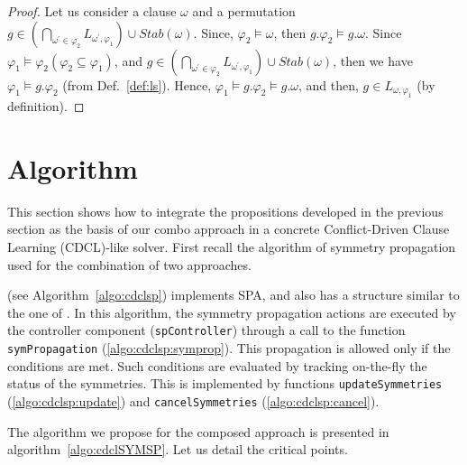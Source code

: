 \begin{proof}
 Let us consider a clause $\omega$ and a permutation $g \in 
 (\underset{\omega^\prime \in \varphi_2}{\bigcap}L_{\omega^\prime,\varphi_1})
 \cup Stab(\omega)$.
 Since, $\varphi_2 \models \omega$, then  $g.\varphi_2 \models g.\omega$. Since $\varphi_1 \models \varphi_2 (\varphi_2 \subseteq \varphi_1)$, and 
 $g \in 
 (\underset{\omega^\prime \in \varphi_2}{\bigcap}L_{\omega^\prime,\varphi_1})
 \cup Stab(\omega)$, then we have $\varphi_1 \models g.\varphi_2$ (from Def.~\ref{def:ls}). Hence, $\varphi_1 \models g.\varphi_2 \models g.\omega$, and then, $g \in L_{\omega,\varphi_1}$ (by definition). 
\end{proof}

\section{Algorithm}
This section shows how to integrate the propositions developed in the previous
section as the basis of our combo approach in a concrete
Conflict-Driven Clause Learning (CDCL)-like solver.
First recall the algorithm of symmetry propagation used for the combination of two approaches.

{\cdclsp} (see Algorithm~\ref{algo:cdclsp}) implements SPA, and also has a
structure similar to the one of {\cdcl}. In this algorithm, the symmetry
propagation actions are executed by the controller component (\texttt{spController})
through a call to the function \texttt{symPropagation} (\cref{algo:cdclsp:symprop}). This
propagation is allowed only if the conditions %
are met. Such conditions are evaluated by tracking on-the-fly the status of the
symmetries. This is implemented by functions \texttt{updateSymmetries} (\cref{algo:cdclsp:update})
and \texttt{cancelSymmetries} (\cref{algo:cdclsp:cancel}).
 
The algorithm we propose for the composed approach is presented in
algorithm~\ref{algo:cdclSYMSP}. 
Let us detail the critical points.
